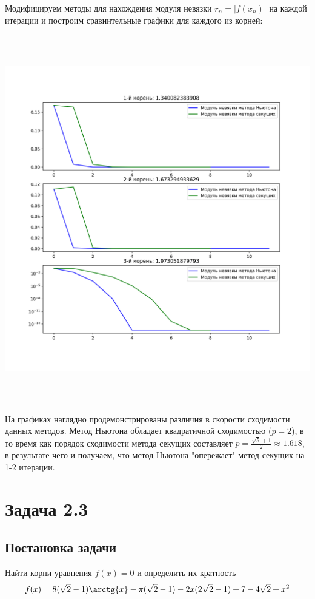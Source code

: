 \documentclass[a4paper,12pt]{report} %
\begin{document}
\newpage

Модифицируем методы для нахождения модуля невязки $r_n = |f(x_n)|$ на каждой итерации и построим сравнительные графики для каждого из корней:

\noindent\includegraphics[height=16cm]{2.2_residual.png}

На графиках наглядно продемонстрированы различия в скорости сходимости данных методов. Метод Ньютона обладает квадратичной сходимостью ($p = 2$), в то время как порядок сходимости метода секущих составляет $p = \frac{\sqrt{5} + 1}{2} \approx 1.618$, в результате чего и получаем, что метод Ньютона "опережает" метод секущих на 1-2 итерации.

\section*{Задача 2.3}
\subsection*{Постановка задачи}
Найти корни уравнения $f(x) = 0$ и определить их кратность
\[
	f(x) = 8(\sqrt{2} - 1)\arctg{x} - \pi(\sqrt{2} - 1) - 2x(2\sqrt{2} - 1) + 7 - 4\sqrt{2} + x^2
\]
\end{document}
